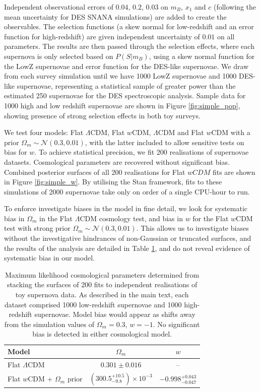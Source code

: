 \documentclass[a4paper,fleqn,usenatbib]{mnras}
\begin{document}
Independent observational errors of $0.04$, $0.2$, $0.03$ on $m_B$, $x_1$ and $c$ (following the mean uncertainty for DES SNANA simulations) are added to create the observables. The selection functions (a skew normal for low-redshift and an error function for high-redshift) are given independent uncertainty of $0.01$ on all parameters. The results are then passed through the selection effects, where each supernova is only selected based on $P(S|m_B)$, using a skew normal function for the LowZ supernovae and error function for the DES-like supernovae. We draw from each survey simulation until we have 1000 LowZ supernovae and 1000 DES-like supernovae, representing a statistical sample of greater power than the estimated 250 supernovae for the DES spectroscopic analysis. Sample data for 1000 high and low redshift supernovae are shown in Figure \ref{fig:simple_pop}, showing presence of strong selection effects in both toy surveys. 

We test four models: Flat $\Lambda$CDM, Flat $w$CDM, $\Lambda$CDM and Flat $w$CDM with a prior $\Omega_m \sim \mathcal{N}(0.3, 0.01)$, with the latter included to allow sensitive tests on bias for $w$. To achieve statistical precision, we fit 200 realisations of supernovae datasets. Cosmological parameters are recovered without significant bias. Combined posterior surfaces of all 200 realisations for Flat $wCDM$ fits are shown in Figure \ref{fig:simple_w}. By utilising the Stan framework, fits to these simulations of 2000 supernovae take only on order of a single CPU-hour to run.

To enforce investigate biases in the model in fine detail, we look for systematic bias in $\Omega_m$ in the Flat $\Lambda$CDM cosmology test, and bias in $w$ for the Flat $w$CDM test with strong prior $\Omega_m \sim \mathcal{N}(0.3, 0.01)$. This allows us to investigate biases without the investigative hindrances of non-Gaussian or truncated surfaces, and the results of the analysis are detailed in Table \ref{tab:simple_model}, and do not reveal evidence of systematic bias in our model.

\begin{table}
	\centering
	\caption{Maximum likelihood cosmological parameters determined from stacking the surfaces of 200 fits to independent realisations of toy supernova data. As described in the main text, each dataset comprised 1000 low-redshift supernovae and 1000 high-redshift supernovae. Model bias would appear as shifts away from the simulation values of $\Omega_m = 0.3$, $w = -1$. No significant bias is detected in either cosmological model.}
	\label{tab:simple_model}
	\begin{tabular}{l|cc}
		\hline
		Model & $\Omega_m$ & $w$ \\ 
		\hline
		Flat $\Lambda$CDM & $0.301\pm 0.016$ & -- \\ 
		Flat $w$CDM + $\Omega_m$ prior & $\left( 300.5^{+10.5}_{-9.8} \right) \times 10^{-3}$ & $-0.998^{+0.043}_{-0.047}$ \\ 
		\hline
	\end{tabular}
\end{table}
\end{document}
